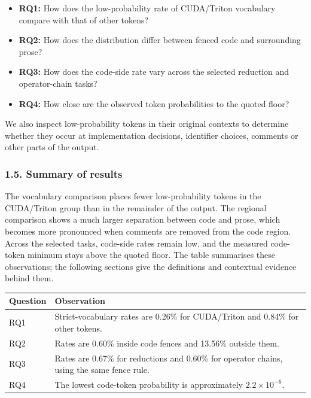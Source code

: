 \documentclass[
  11pt,
]{article}
\providecommand{\tightlist}{%
  \setlength{\itemsep}{0pt}\setlength{\parskip}{0pt}}
\begin{document}
\begin{itemize}
\tightlist
\item
  \textbf{RQ1:} How does the low-probability rate of CUDA/Triton
  vocabulary compare with that of other tokens?
\item
  \textbf{RQ2:} How does the distribution differ between fenced code and
  surrounding prose?
\item
  \textbf{RQ3:} How does the code-side rate vary across the selected
  reduction and operator-chain tasks?
\item
  \textbf{RQ4:} How close are the observed token probabilities to the
  quoted floor?
\end{itemize}

We also inspect low-probability tokens in their original contexts to
determine whether they occur at implementation decisions, identifier
choices, comments or other parts of the output.

\hypertarget{summary-of-results}{%
\subsubsection{1.5. Summary of results}\label{summary-of-results}}

The vocabulary comparison places fewer low-probability tokens in the
CUDA/Triton group than in the remainder of the output. The regional
comparison shows a much larger separation between code and prose, which
becomes more pronounced when comments are removed from the code region.
Across the selected tasks, code-side rates remain low, and the measured
code-token minimum stays above the quoted floor. The table summarises
these observations; the following sections give the definitions and
contextual evidence behind them.

\begin{center}
\begin{minipage}{\linewidth}
\centering
\begin{tabular}{@{}
  >{\raggedright\arraybackslash}p{}
  >{\raggedright\arraybackslash}p{}@{}}
\toprule
Question & Observation \\
\midrule

RQ1 & Strict-vocabulary rates are 0.26\% for CUDA/Triton and 0.84\% for
other tokens. \\
RQ2 & Rates are 0.60\% inside code fences and 13.56\% outside them. \\
RQ3 & Rates are 0.67\% for reductions and 0.60\% for operator chains,
using the same fence rule. \\
RQ4 & The lowest code-token probability is approximately
\(2.2\times10^{-6}\). \\
\bottomrule
\end{tabular}
\end{minipage}
\end{center}
\end{document}
